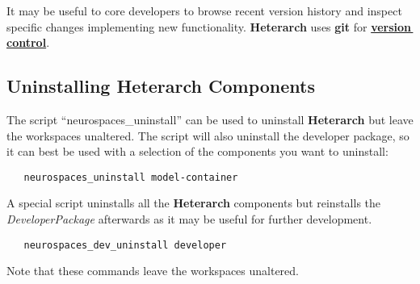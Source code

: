 \documentclass[12pt]{article}
\begin{document}
It may be useful to core developers to browse recent version history
and inspect specific changes implementing new functionality.  {\bf\small{Heterarch}} uses {\bf git} for
\href{../version-control/version-control.tex}{\bf version\,control}.



\subsection*{Uninstalling Heterarch Components}

The script ``neurospaces\_uninstall'' can be used to uninstall
{\bf\small{Heterarch}} but leave the workspaces unaltered.  The script
will also uninstall the developer package, so it can best be used with
a selection of the components you want to uninstall:

\begin{verbatim}
   neurospaces_uninstall model-container
\end{verbatim}
A special script uninstalls all the {\bf\small{Heterarch}} components but reinstalls the
{\it DeveloperPackage} afterwards as it may be useful for further development.
\begin{verbatim}
   neurospaces_dev_uninstall developer
\end{verbatim}
Note that these commands leave the workspaces unaltered.
\end{document}
